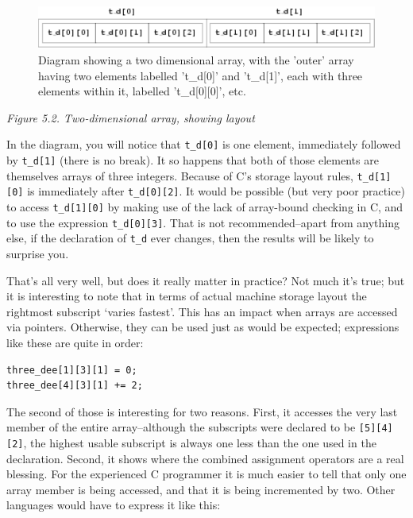    \begin{figure}\centering\includegraphics[type=pdf,read=.pdf,ext=.pdf,scale=1.0]{figure/5.2}\caption{Diagram showing a two dimensional array, with the 'outer' array            having two elements labelled 't\_d[0]' and 't\_d[1]', each with            three elements within it, labelled 't\_d[0][0]', etc.}\end{figure}

\begin{center}\textit{Figure 5.2. Two-dimensional array, showing layout}\end{center}


   In the diagram, you will notice that \texttt{t\_d[0]} is one
    element, immediately followed by \texttt{t\_d[1]} (there is no
    break).  It so happens that both of those elements are themselves arrays
    of three integers. Because of C's storage layout rules,
    \texttt{t\_d[1][0]} is immediately after \texttt{t\_d[0][2]}. It
    would be possible (but very poor practice) to access
    \texttt{t\_d[1][0]} by making use of the lack of array-bound checking
    in C, and to use the expression \texttt{t\_d[0][3]}. That is not
    recommended--apart from anything else, if the declaration of
    \texttt{t\_d} ever changes, then the results will be likely to
    surprise you.


   That's all very well, but does it really matter in practice? Not much
    it's true; but it is interesting to note that in terms of actual machine
    storage layout the rightmost subscript `varies fastest'. This has
    an impact when arrays are accessed via pointers. Otherwise, they can be
    used just as would be expected; expressions like these are quite in
    order:


   \begin{Verbatim}
three_dee[1][3][1] = 0;
three_dee[4][3][1] += 2;
\end{Verbatim}

   The second of those is interesting for two reasons. First, it accesses
    the very last member of the entire array--although the subscripts
    were declared to be \texttt{[5][4][2]}, the highest usable subscript
    is always one less than the one used in the declaration. Second, it
    shows where the combined assignment operators are a real blessing. For
    the experienced C programmer it is much easier to tell that only one
    array member is being accessed, and that it is being incremented by two.
    Other languages would have to express it like this:


